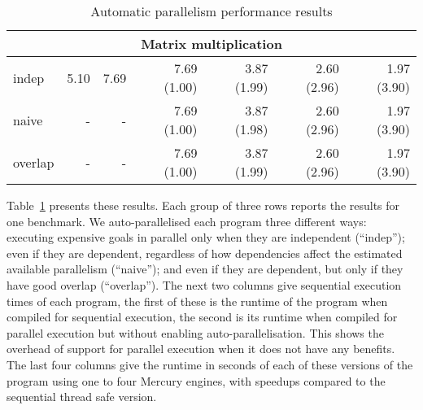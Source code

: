 \begin{table}[tb]
\begin{center}
\begin{tabular}{l|rr|rrrr}
\hline
\hline
\multicolumn{7}{c}{Matrix multiplication} \\
\hline
indep    & 5.10 & 7.69 & 7.69 (1.00) & 3.87 (1.99) & 2.60 (2.96) & 1.97 (3.90) \\
naive    &    - &    - & 7.69 (1.00) & 3.87 (1.98) & 2.60 (2.96) & 1.97 (3.90) \\
overlap  &    - &    - & 7.69 (1.00) & 3.87 (1.99) & 2.60 (2.96) & 1.97 (3.90) \\
\end{tabular}
\end{center}
\caption{Automatic parallelism performance results}
\label{tab:autopar}
\end{table}

Table~\ref{tab:autopar} presents these results.
Each group of three rows reports the results for one benchmark.
We auto-parallelised each program three different ways:
executing expensive goals in parallel
only when they are independent (``indep'');
even if they are dependent, regardless of how dependencies affect the
estimated available parallelism (``naive'');  and
even if they are dependent, but only if they have good overlap (``overlap'').
The next two columns give sequential execution times of each program,
the first of these is the
runtime of the program when compiled for sequential execution,
the second is
its runtime when compiled for parallel execution
but without enabling auto-parallelisation.
This shows the overhead of support for parallel execution
when it does not have any benefits.
The last four columns give the runtime in seconds
of each of these versions of the program
using one to four Mercury engines,
with speedups compared to the sequential thread safe version.

